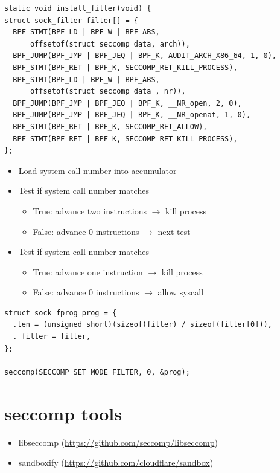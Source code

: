 \documentclass[usenames,dvipsnames]{beamer}
\newcommand{\codeinline}[1] {\texttt{\smaller[2]{#1}}}
\begin{document}
\begin{frame}[fragile]
\footnotesize
\begin{verbatim}
static void install_filter(void) {
struct sock_filter filter[] = {
  BPF_STMT(BPF_LD | BPF_W | BPF_ABS, 
      offsetof(struct seccomp_data, arch)),
  BPF_JUMP(BPF_JMP | BPF_JEQ | BPF_K, AUDIT_ARCH_X86_64, 1, 0),
  BPF_STMT(BPF_RET | BPF_K, SECCOMP_RET_KILL_PROCESS),
  BPF_STMT(BPF_LD | BPF_W | BPF_ABS,
      offsetof(struct seccomp_data , nr)),
  BPF_JUMP(BPF_JMP | BPF_JEQ | BPF_K, __NR_open, 2, 0),
  BPF_JUMP(BPF_JMP | BPF_JEQ | BPF_K, __NR_openat, 1, 0),
  BPF_STMT(BPF_RET | BPF_K, SECCOMP_RET_ALLOW),
  BPF_STMT(BPF_RET | BPF_K, SECCOMP_RET_KILL_PROCESS),
};
\end{verbatim}
\begin{itemize}
\item Load system call number into accumulator
\item Test if system call number matches \codeinline{\_\_NR\_open}
  \begin{itemize}
  \item True: advance two instructions $\rightarrow$ kill process
  \item False: advance 0 instructions $\rightarrow$ next test
  \end{itemize}
\item Test if system call number matches \codeinline{\_\_NR\_openat}
  \begin{itemize}
  \item True: advance one instruction $\rightarrow$ kill process
  \item False: advance 0 instructions $\rightarrow$ allow syscall
  \end{itemize}
\end{itemize}
\end{frame}

\begin{frame}[fragile]
\small
\begin{verbatim}
struct sock_fprog prog = {
  .len = (unsigned short)(sizeof(filter) / sizeof(filter[0])),
  . filter = filter,
};

seccomp(SECCOMP_SET_MODE_FILTER, 0, &prog);
\end{verbatim}
\end{frame}

\section{seccomp tools}
\begin{frame}
\begin{itemize}
  \item libseccomp (\url{https://github.com/seccomp/libseccomp})
  \item sandboxify (\url{https://github.com/cloudflare/sandbox})
\end{itemize}
\end{frame}
\end{document}

